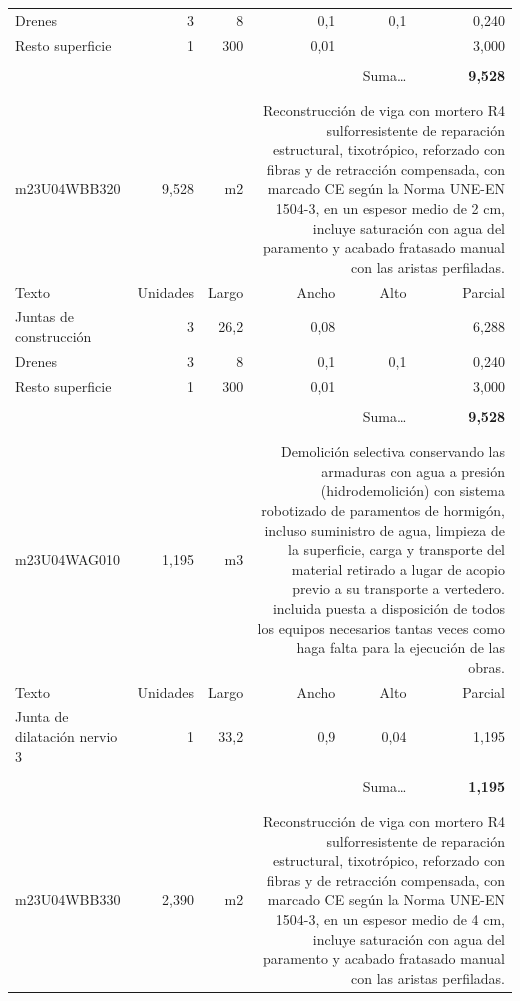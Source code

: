 \documentclass{book}%
\begin{document}
\begin{longtable}{lrrrrr}
\multicolumn{1}{p{3.5cm}}{Drenes}&3&8&0,1&0,1&     0,240\\%
\multicolumn{1}{p{3.5cm}}{Resto superficie}&1&300&0,01&&     3,000\\%
&&&&&\\%
\multicolumn{5}{r}{Suma\ldots}&\textbf{     9,528}\\%
\hline%
&&&&&\\%
&&&&&\\%
m23U04WBB320&     9,528& m2&\multicolumn{3}{p{6cm}}{\scriptsize Reconstrucción de viga con mortero R4 sulforresistente de reparación estructural, tixotrópico, reforzado con fibras y de retracción compensada, con marcado CE según la Norma UNE-EN 1504-3, en un espesor medio de 2 cm, incluye saturación con agua del paramento y acabado fratasado manual con las aristas perfiladas.\normalsize}\\%
Texto&Unidades&Largo&Ancho&Alto&Parcial\\%
\hline%
\multicolumn{1}{p{3.5cm}}{Juntas de construcción}&3&26,2&0,08&&     6,288\\%
\multicolumn{1}{p{3.5cm}}{Drenes}&3&8&0,1&0,1&     0,240\\%
\multicolumn{1}{p{3.5cm}}{Resto superficie}&1&300&0,01&&     3,000\\%
&&&&&\\%
\multicolumn{5}{r}{Suma\ldots}&\textbf{     9,528}\\%
\hline%
&&&&&\\%
&&&&&\\%
m23U04WAG010&     1,195& m3&\multicolumn{3}{p{6cm}}{\scriptsize Demolición selectiva conservando las armaduras con agua a presión (hidrodemolición) con sistema robotizado de paramentos de hormigón, incluso suministro de agua, limpieza de la superficie, carga y transporte del material retirado a lugar de acopio previo a su transporte a vertedero. incluida puesta a disposición de todos los equipos necesarios tantas veces como haga falta para la ejecución de las obras.\normalsize}\\%
Texto&Unidades&Largo&Ancho&Alto&Parcial\\%
\hline%
\multicolumn{1}{p{3.5cm}}{Junta de dilatación nervio 3}&1&33,2&0,9&0,04&     1,195\\%
&&&&&\\%
\multicolumn{5}{r}{Suma\ldots}&\textbf{     1,195}\\%
\hline%
&&&&&\\%
&&&&&\\%
m23U04WBB330&     2,390& m2&\multicolumn{3}{p{6cm}}{\scriptsize Reconstrucción de viga con mortero R4 sulforresistente de reparación estructural, tixotrópico, reforzado con fibras y de retracción compensada, con marcado CE según la Norma UNE-EN 1504-3, en un espesor medio de 4 cm, incluye saturación con agua del paramento y acabado fratasado manual con las aristas perfiladas.\normalsize}\\%

\end{longtable}
\end{document}
